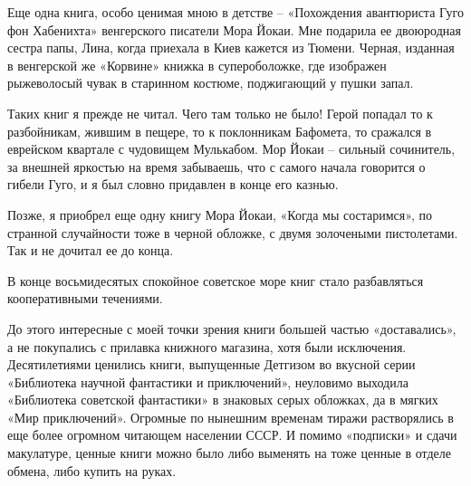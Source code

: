 

Еще одна книга, особо ценимая мною в детстве – «Похождения авантюриста Гуго фон Хабенихта» венгерского писатели Мора Йокаи. Мне подарила ее двоюродная сестра папы, Лина, когда приехала в Киев кажется из Тюмени. Черная, изданная в венгерской же «Корвине» книжка в супероболожке, где изображен рыжеволосый чувак в старинном костюме, поджигающий у пушки запал.

Таких книг я прежде не читал. Чего там только не  было! Герой попадал то к разбойникам, жившим в пещере, то к поклонникам Бафомета, то сражался в еврейском квартале с чудовищем Мулькабом. Мор Йокаи – сильный сочинитель, за внешней яркостью на время забываешь, что с самого начала говорится о гибели Гуго, и я был словно придавлен в конце его казнью.

Позже, я приобрел еще одну книгу Мора Йокаи, «Когда мы состаримся», по странной случайности тоже в черной обложке, с двумя золочеными пистолетами. Так и не дочитал ее до конца.
 
В конце восьмидесятых спокойное советское море книг стало разбавляться кооперативными течениями. 

До этого интересные с моей точки зрения книги большей частью «доставались», а не покупались с прилавка книжного магазина, хотя были исключения. Десятилетиями ценились книги, выпущенные Детгизом во вкусной серии «Библиотека научной фантастики и приключений», неуловимо выходила «Библиотека советской фантастики» в знаковых серых обложках, да в мягких «Мир приключений». Огромные по нынешним временам тиражи растворялись в еще более огромном читающем населении СССР. И помимо «подписки» и сдачи макулатуре, ценные книги можно было либо выменять на тоже ценные в отделе обмена, либо купить на руках.

